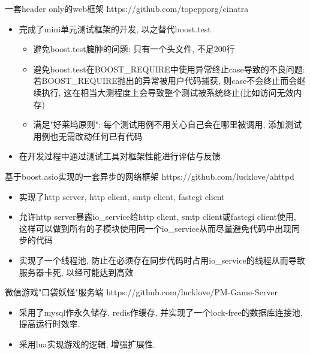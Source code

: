 \documentclass{resume}
\begin{document}
\begin{multicols}{2}
\begin{onehalfspacing}
一套header only的web框架 
\newline
https://github.com/topcpporg/cinatra
\begin{itemize}
  \item 完成了mini单元测试框架的开发, 以之替代boost.test
  \begin{itemize}
    \item 避免boost.test臃肿的问题: 只有一个头文件, 不足200行
    \item 避免boost.test在BOOST\_REQUIRE中使用异常终止case导致的不良问题: 若BOOST\_REQUIRE抛出的异常被用户代码捕获, 则case不会终止而会继续执行, 这在相当大测程度上会导致整个测试被系统终止(比如访问无效内存)
    \item 满足"好莱坞原则": 每个测试用例不用关心自己会在哪里被调用, 添加测试用例也无需改动任何已有代码
  \end{itemize}
  \item 在开发过程中通过测试工具对框架性能进行评估与反馈
\end{itemize}
\end{onehalfspacing}

\begin{onehalfspacing}
基于boost.asio实现的一套异步的网络框架
\newline
https://github.com/lucklove/ahttpd
\begin{itemize}
  \item 实现了http server, http client, smtp client, fastcgi client
  \item 允许http server暴露io\_service给http client, smtp client或fastcgi client使用, 这样可以做到所有的子模块使用同一个io\_service从而尽量避免代码中出现同步的代码
  \item 实现了一个线程池, 防止在必须存在同步代码时占用io\_service的线程从而导致服务器卡死, 以经可能达到高效
\end{itemize}
\end{onehalfspacing}

\begin{onehalfspacing}
微信游戏"口袋妖怪"服务端
\newline
https://github.com/lucklove/PM-Game-Server
\begin{itemize}
  \item 采用了mysql作永久储存, redis作缓存, 并实现了一个lock-free的数据库连接池, 提高运行时效率.
  \item 采用lua实现游戏的逻辑, 增强扩展性.
\end{itemize}
\end{onehalfspacing}


\end{multicols}
\end{document}
